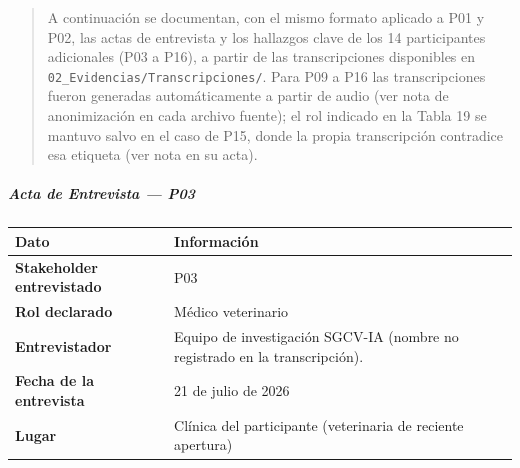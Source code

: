 \documentclass[
]{article}
\newcounter{none} %
\begin{document}
\begin{quote}
A continuación se documentan, con el mismo formato aplicado a P01 y P02,
las actas de entrevista y los hallazgos clave de los 14 participantes
adicionales (P03 a P16), a partir de las transcripciones disponibles en
\texttt{02\_Evidencias/Transcripciones/}. Para P09 a P16 las transcripciones
fueron generadas automáticamente a partir de audio (ver nota de
anonimización en cada archivo fuente); el rol indicado en la Tabla 19 se
mantuvo salvo en el caso de P15, donde la propia transcripción contradice
esa etiqueta (ver nota en su acta).
\end{quote}

\subparagraph{Acta de Entrevista --- P03}\label{acta-entrevista-p03}

{\def\LTcaptype{none} %
\begin{longtable}[]{|
  >{\raggedright\arraybackslash}p{}|
  >{\raggedright\arraybackslash}p{}|}
\hline
\begin{minipage}[b]{\linewidth}\centering
\textbf{Dato}
\end{minipage} & \begin{minipage}[b]{\linewidth}\centering
\textbf{Información}
\end{minipage} \\
\hline
\endhead
\hline
\endlastfoot
\textbf{Stakeholder entrevistado} & \begin{minipage}[t]{\linewidth}\raggedright
P03
\end{minipage} \\
\hline
\textbf{Rol declarado} & \begin{minipage}[t]{\linewidth}\raggedright
Médico veterinario
\end{minipage} \\
\hline
\textbf{Entrevistador} & \begin{minipage}[t]{\linewidth}\raggedright
Equipo de investigación SGCV-IA (nombre no registrado en la transcripción).
\end{minipage} \\
\hline
\textbf{Fecha de la entrevista} & \begin{minipage}[t]{\linewidth}\raggedright
21 de julio de 2026
\end{minipage} \\
\hline
\textbf{Lugar} & \begin{minipage}[t]{\linewidth}\raggedright
Clínica del participante (veterinaria de reciente apertura)

\end{minipage}
\end{longtable}}
\end{document}
